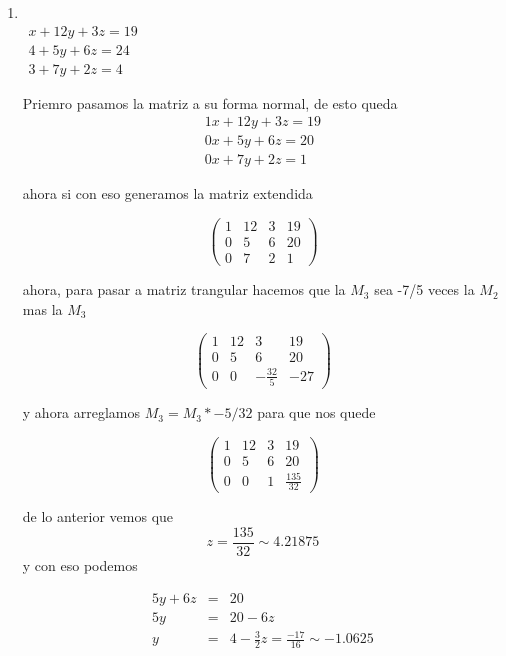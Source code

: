 \documentclass[11pt]{article}
\begin{document}
\begin{multicols}{2}
\begin{enumerate}[\bf{Sistema} 1]
		\item
			\ \\ $\begin{matrix}
				x + 12y + 3z = 19 \\
				4 +  5y + 6z = 24 \\
				3 +  7y + 2z = 4
			\end{matrix}$
			
			\par Priemro pasamos la matriz a su forma normal, de esto queda
			$$\begin{matrix}
				1x + 12y + 3z = 19 \\
				0x +  5y + 6z = 20 \\
				0x +  7y + 2z = 1
			\end{matrix}$$
			
			ahora si con eso generamos la matriz extendida
			
			$$\left(\begin{array}{rrrr}
				1 & 12 & 3 & 19 \\
				0 & 5 & 6 & 20 \\
				0 & 7 & 2 & 1
			\end{array}\right)$$
			
 			ahora, para pasar a matriz trangular hacemos que la $M_3$ sea -7/5 veces la $M_2$ mas la $M_3$
			
			$$\left(\begin{array}{rrrr}
				1 & 12 & 3 & 19 \\
				0 & 5 & 6 & 20 \\
				0 & 0 & -\frac{32}{5} & -27
			\end{array}\right)$$
			
			y ahora arreglamos $M_3 = M_3 * -5/32$ para que nos quede
			
			$$\left(\begin{array}{rrrr}
				1 & 12 & 3 & 19 \\
				0 & 5 & 6 & 20 \\
				0 & 0 & 1 & \frac{135}{32}
			\end{array}\right)$$
			
			de lo anterior vemos que $$z = \frac{135}{32} \sim 4.21875$$ y con eso podemos
			
			\begin{eqnarray*}
				5y + 6z &=& 20 \\
				5y &=& 20 - 6z \\
				y &=& 4 - \frac{3}{2}z = \frac{-17}{16} \sim -1.0625
			\end{eqnarray*}
			

\end{enumerate}
\end{multicols}
\end{document}

